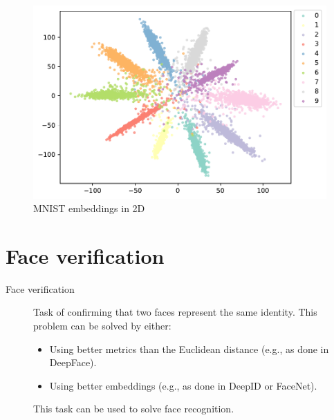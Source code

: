 \begin{description}
\begin{remark}
            \begin{figure}[H]
                \centering
                \includegraphics[width=0.45\linewidth]{./img/_mnist_embeddings.pdf}
                \caption{MNIST embeddings in 2D}
            \end{figure}
        \end{remark}
\end{description}


\section{Face verification}

\begin{description}
    \item[Face verification] 
        Task of confirming that two faces represent the same identity. This problem can be solved by either:
        \begin{itemize}
            \item Using better metrics than the Euclidean distance (e.g., as done in DeepFace).
            \item Using better embeddings (e.g., as done in DeepID or FaceNet).
        \end{itemize}

        \begin{remark}
            This task can be used to solve face recognition.
        \end{remark}
\end{description}


